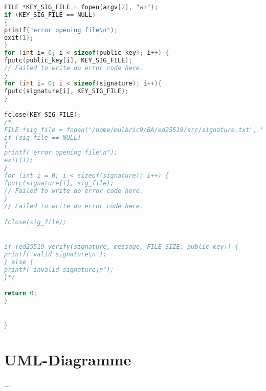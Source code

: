 \documentclass[thesis=bachelor,faculty=cb]{hsmw-thesis}
\begin{document}
\begin{lstlisting}[language=C]
FILE *KEY_SIG_FILE = fopen(argv[2], "w+");
if (KEY_SIG_FILE == NULL)
{
printf("error opening file\n");
exit(1);
}
for (int i= 0; i < sizeof(public_key); i++) {
fputc(public_key[i], KEY_SIG_FILE);
// Failed to write do error code here.
}
for (int i= 0; i < sizeof(signature); i++){
fputc(signature[i], KEY_SIG_FILE);
}

fclose(KEY_SIG_FILE);
/*
FILE *sig_file = fopen("/home/mulbric9/BA/ed25519/src/signature.txt", "w+");
if (sig_file == NULL)
{
printf("error opening file\n");
exit(1);
}
for (int i = 0; i < sizeof(signature); i++) {
fputc(signature[i], sig_file);
// Failed to write do error code here.
}
// Failed to write do error code here.

fclose(sig_file);


if (ed25519_verify(signature, message, FILE_SIZE, public_key)) {
printf("valid signature\n");
} else {
printf("invalid signature\n");
}*/

return 0;
}


}
\end{lstlisting}
	\appendix %
	\chapter{UML-Diagramme}
	...
\end{document}
